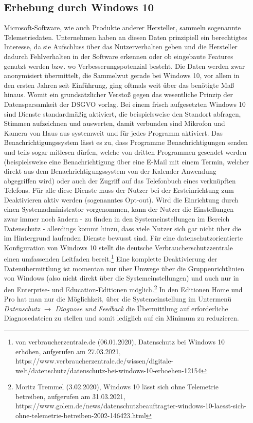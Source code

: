 \subsection{Erhebung durch Windows 10}
Microsoft-Software, wie auch Produkte anderer Hersteller, sammeln sogenannte Telemetriedaten. Unternehmen haben an diesen Daten prinzipiell ein berechtigtes Interesse, da sie Aufschluss über das Nutzerverhalten geben und die Hersteller dadurch Fehlverhalten in der Software erkennen oder ob eingebaute Features genutzt werden bzw. wo Verbesserungspotenzial besteht. Die Daten werden zwar anonymisiert übermittelt, die Sammelwut gerade bei Windows 10, vor allem in den ersten Jahren seit Einführung, ging oftmals weit über das benötigte Maß hinaus. Womit ein grundsätzlicher Verstoß gegen das wesentliche Prinzip der Datensparsamkeit der DSGVO vorlag. Bei einem frisch aufgesetzten Windows 10 sind Dienste standardmäßig aktiviert, die beispielsweise den Standort abfragen, Stimmen aufzeichnen und auswerten, damit verbunden sind Mikrofon und Kamera von Haus aus systemweit und für jedes Programm aktiviert. Das Benachrichtigungssystem lässt es zu, dass Programme Benachrichtigungen senden und teils sogar mitlesen dürfen, welche von dritten Programmen gesendet werden (beispielsweise eine Benachrichtigung über eine E-Mail mit einem Termin, welcher direkt aus dem Benachrichtigungssystem von der Kalender-Anwendung abgegriffen wird) oder auch der Zugriff auf das Telefonbuch eines verknüpften Telefons. Für alle diese Dienste muss der Nutzer bei der Ersteinrichtung zum Deaktivieren aktiv werden (sogenanntes Opt-out). Wird die Einrichtung durch einen Systemadministrator vorgenommen, kann der Nutzer die Einstellungen zwar immer noch ändern - zu finden in den Systemeinstellungen im Bereich \glqq Datenschutz\grqq{} - allerdings kommt hinzu, dass viele Nutzer sich gar nicht über die im Hintergrund laufenden Dienste bewusst sind. Für eine datenschutzorientierte Konfiguration von Windows 10 stellt die deutsche Verbraucherschutzzentrale einen umfassenden Leitfaden bereit.\footnote{von verbraucherzentrale.de (06.01.2020), Datenschutz bei Windows 10 erhöhen, aufgerufen am 27.03.2021, https://www.verbraucherzentrale.de/wissen/digitale-welt/datenschutz/datenschutz-bei-windows-10-erhoehen-12154} Eine komplette Deaktivierung der Datenübermittlung ist momentan nur über Umwege über die Gruppenrichtlinien von Windows (also nicht direkt über die Systemeinstellungen) und auch nur in den Enterprise- und Education-Editionen möglich.\footnote{Moritz Tremmel (3.02.2020), Windows 10 lässt sich ohne Telemetrie betreiben, aufgerufen am 31.03.2021, https://www.golem.de/news/datenschutzbeauftragter-windows-10-laesst-sich-ohne-telemetrie-betreiben-2002-146423.html} In den Editionen Home und Pro hat man nur die Möglichkeit, über die Systemeinstellung im Untermenü \textit{Datenschutz $\rightarrow$ Diagnose und Feedback} die Übermittlung auf \glqq erforderliche Diagnosedateien\grqq{} zu stellen und somit lediglich auf ein Minimum zu reduzieren.

